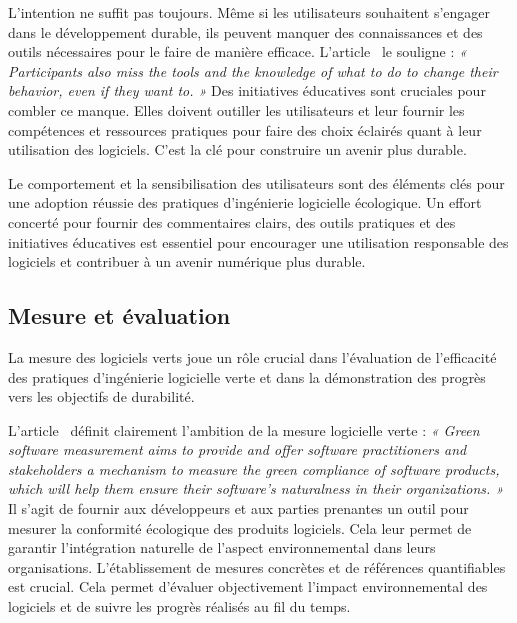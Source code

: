 L'intention ne suffit pas toujours. Même si les utilisateurs souhaitent s'engager dans le développement durable, ils peuvent manquer des connaissances et des outils nécessaires pour le faire de manière efficace. L'article~\cite{ImpactGreenFeedback} le souligne : \emph{« Participants also miss the tools and the knowledge of what to do to change their behavior, even if they want to. »} Des initiatives éducatives sont cruciales pour combler ce manque. Elles doivent outiller les utilisateurs et leur fournir les compétences et ressources pratiques pour faire des choix éclairés quant à leur utilisation des logiciels. C'est la clé pour construire un avenir plus durable.


Le comportement et la sensibilisation des utilisateurs sont des éléments clés pour une adoption réussie des pratiques d'ingénierie logicielle écologique. Un effort concerté pour fournir des commentaires clairs, des outils pratiques et des initiatives éducatives est essentiel pour encourager une utilisation responsable des logiciels et contribuer à un avenir numérique plus durable.


\subsection{Mesure et évaluation}

La mesure des logiciels verts joue un rôle crucial dans l'évaluation de l'efficacité des pratiques d'ingénierie logicielle verte et dans la démonstration des progrès vers les objectifs de durabilité.


L'article~\cite{GreenMeasurementStructure} définit clairement l'ambition de la mesure logicielle verte : \emph{« Green software measurement aims to provide and offer software practitioners and stakeholders a mechanism to measure the green compliance of software products, which will help them ensure their software's naturalness in their organizations. »} Il s'agit de fournir aux développeurs et aux parties prenantes un outil pour mesurer la conformité écologique des produits logiciels. Cela leur permet de garantir l'intégration naturelle de l'aspect environnemental dans leurs organisations. L'établissement de mesures concrètes et de références quantifiables est crucial. Cela permet d'évaluer objectivement l'impact environnemental des logiciels et de suivre les progrès réalisés au fil du temps.


